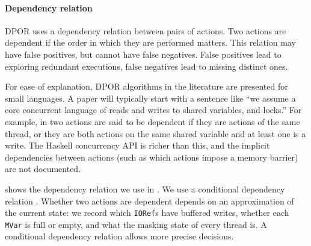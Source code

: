 \paragraph{Dependency relation}
DPOR uses a dependency relation between pairs of actions.  Two actions
are dependent if the order in which they are performed matters.  This
relation may have false positives, but cannot have false negatives.
False positives lead to exploring redundant executions, false
negatives lead to missing distinct ones.

For ease of explanation, DPOR algorithms in the literature are
presented for small languages.  A paper will typically start with a
sentence like ``we assume a core concurrent language of reads and
writes to shared variables, and locks.''  For example, in
\cite{coons2013} two actions are said to be dependent if they are
actions of the same thread, or they are both actions on the same
shared variable and at least one is a write.  The Haskell concurrency
API is richer than this, and the implicit dependencies between actions
(such as which actions impose a memory barrier) are not documented.

 shows the dependency relation we use in \dejafu{}.
We use a conditional dependency relation \parencite{godefroid1993}.
Whether two actions are dependent depends on an approximation of the
current state: we record which \verb|IORef|s have buffered writes,
whether each \verb|MVar| is full or empty, and what the masking state
of every thread is.  A conditional dependency relation allows more
precise decisions.

